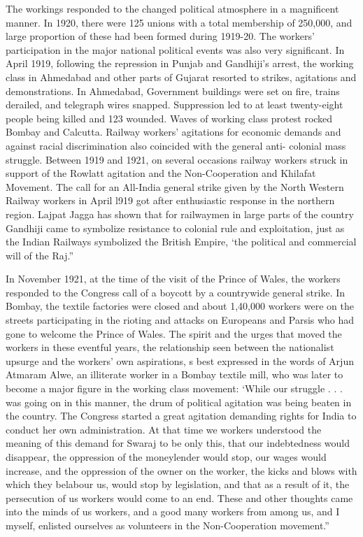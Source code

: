 The workings responded to the changed political atmosphere in a magnificent manner. In 1920, there were 125 unions with a total membership of 250,000, and large proportion of these had been formed during 1919-20. The workers’ participation in the major national political events was also very significant. In April 1919, following the repression in Punjab and Gandhiji’s arrest, the working class in Ahmedabad and other parts of Gujarat resorted to strikes, agitations and demonstrations. In Ahmedabad, Government buildings were set on fire, trains derailed, and telegraph wires snapped. Suppression led to at least twenty-eight people being killed and 123 wounded. Waves of working class protest rocked Bombay and Calcutta. Railway workers’ agitations for economic demands and against racial discrimination also coincided with the general anti- colonial mass struggle. Between 1919 and 1921, on several occasions railway workers struck in support of the Rowlatt agitation and the Non-Cooperation and Khilafat Movement. The call for an All-India general strike given by the North Western Railway workers in April l919 got after enthusiastic response in the northern region. Lajpat Jagga has shown that for railwaymen in large parts of the country Gandhiji came to symbolize resistance to colonial rule and exploitation, just as the Indian Railways symbolized the British Empire, ‘the political and commercial will of the Raj.”

In November 1921, at the time of the visit of the Prince of Wales, the workers responded to the Congress call of a boycott by a countrywide general strike. In Bombay, the textile factories were closed and about 1,40,000 workers were on the streets participating in the rioting and attacks on Europeans and Parsis who had gone to welcome the Prince of Wales. The spirit and the urges that moved the workers in these eventful years, the relationship seen between the nationalist upsurge and the workers’ own aspirations, s best expressed in the words of Arjun Atmaram Alwe, an illiterate worker in a Bombay textile mill, who was later to become a major figure in the working class movement: ‘While our struggle . . . was going on in this manner, the drum of political agitation was being beaten in the country. The Congress started a great agitation demanding rights for India to conduct her own administration. At that time we workers understood the meaning of this demand for Swaraj to be only this, that our indebtedness would disappear, the oppression of the moneylender would stop, our wages would increase, and the oppression of the owner on the worker, the kicks and blows with which they belabour us, would stop by legislation, and that as a result of it, the persecution of us workers would come to an end. These and other thoughts came into the minds of us workers, and a good many workers from among us, and I myself, enlisted ourselves as volunteers in the Non-Cooperation movement.”

